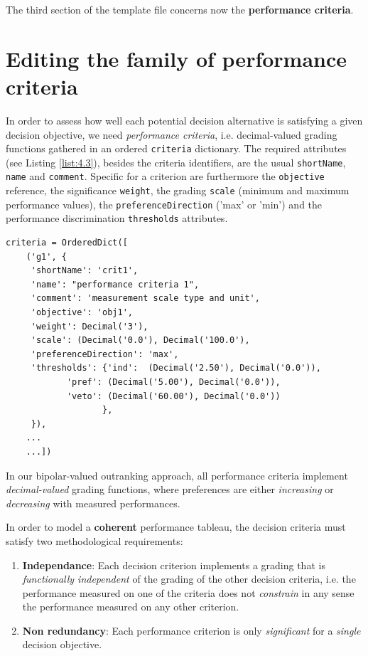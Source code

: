 The third section of the template file concerns now the \textbf{performance criteria}.

\section{Editing the family of performance criteria}
\label{sec:4.4}

In order to assess how well each potential decision alternative is satisfying a given decision objective, we need \emph{performance criteria}, i.e. decimal-valued grading functions gathered in an ordered \texttt{criteria} dictionary. The required attributes (see Listing \ref{list:4.3}), besides the criteria identifiers, are the usual \texttt{shortName}, \texttt{name} and \texttt{comment}. Specific for a criterion are furthermore the \texttt{objective} reference, the significance \texttt{weight}, the grading \texttt{scale} (minimum and  maximum performance values), the \texttt{preferenceDirection} ('max' or 'min') and the performance discrimination \texttt{thresholds} attributes.

\begin{lstlisting}[caption={Example of performance criteria description},label=list:4.3,basicstyle=\footnotesize]
   criteria = OrderedDict([
    ('g1', {
     'shortName': 'crit1',
     'name': "performance criteria 1",
     'comment': 'measurement scale type and unit',
     'objective': 'obj1',
     'weight': Decimal('3'),
     'scale': (Decimal('0.0'), Decimal('100.0'),
     'preferenceDirection': 'max',
     'thresholds': {'ind':  (Decimal('2.50'), Decimal('0.0')),
		    'pref': (Decimal('5.00'), Decimal('0.0')),
		    'veto': (Decimal('60.00'), Decimal('0.0'))
                   },
     }),
    ...
    ...])
\end{lstlisting}

In our bipolar-valued outranking approach, all performance criteria implement \emph{decimal-valued} grading functions, where preferences are either \emph{increasing} or \emph{decreasing} with measured performances.

In order to model a \textbf{coherent} performance tableau, the decision criteria must satisfy two methodological requirements:
\begin{enumerate}
\item \textbf{Independance}: Each decision criterion implements a grading that is \emph{functionally independent} of the grading of the other decision criteria, i.e. the performance measured on one of the criteria does not \emph{constrain} in any sense the performance measured on any other criterion.
\item \textbf{Non redundancy}: Each performance criterion is only \emph{significant} for a \emph{single} decision objective.
\end{enumerate}

